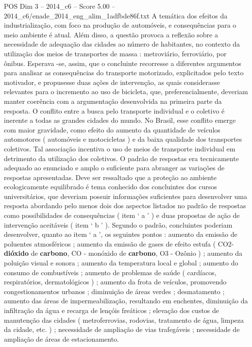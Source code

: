 \begin{textsample}{POS Dim 3 – 2014\_c6 – Score 5.00 – 2014\_c6/enade\_2014\_eng\_alim\_1adfbde86f.txt}
A temática dos efeitos da industrialização, com foco na produção de automóveis, e consequências para o meio ambiente é atual.
Além disso, a questão provoca a reflexão sobre a necessidade de adequação das cidades ao número de habitantes, no contexto da utilização dos meios de transportes de massa : metroviário, ferroviário, por ônibus.
Esperava -se, assim, que o concluinte recorresse a diferentes argumentos para analisar as consequências do transporte motorizado, explicitados pelo texto motivador, e propusesse duas ações de intervenção, as quais considerasse relevantes para o incremento ao uso de bicicleta, que, preferencialmente, deveriam manter coerência com a argumentação desenvolvida na primeira parte da resposta.
O conflito entre a busca pelo transporte individual e o coletivo é inerente a todas as grandes cidades do mundo.
No Brasil, esse conflito emerge com maior gravidade, como efeito do aumento da quantidade de veículos automotores ( automóveis e motocicletas ) e da baixa qualidade dos transportes coletivos.
Tal associação incentiva o uso de meios de transporte individual em detrimento da utilização dos coletivos.
O padrão de respostas era tecnicamente adequado ao enunciado e amplo o suficiente para abranger as variações de respostas apresentadas.
Deve ser ressaltado que a proteção ao ambiente ecologicamente equilibrado é tema conhecido dos concluintes dos cursos universitários, que deveriam possuir informações suficientes para desenvolver uma resposta abordando pelo menos dois dos aspectos listados no padrão de respostas como possibilidades de consequências ( item ‘ a ’ ) e duas propostas de ação de intervenção aceitáveis ( item ‘ b ’ ).
Segundo o padrão, concluintes poderiam desenvolver, quanto ao item ‘ a ’, os seguintes pontos : aumento da emissão de poluentes atmosféricos ; aumento da emissão de gases de efeito estufa ( CO2- \textbf{dióxido} de \textbf{carbono}, CO - monóxido de \textbf{carbono}, O3 - Ozônio ) ; aumento da poluição visual e sonora ; aumento da temperatura local e global ; aumento do consumo de combustíveis ; aumento de problemas de saúde ( cardíacos, respiratórios, dermatológicos ) ; aumento da frota de veículos, promovendo congestionamentos urbanos ; diminuição de áreas verdes ; desmatamento ; aumento das áreas de impermeabilização, resultando em enchentes, diminuição da infiltração da água e recarga de lençóis freáticos ; elevação dos custos de manutenção das cidades ( metroferrovias, rodovias, tratamento de água, limpeza da cidade, etc. ) ; necessidade de ampliação de vias trafegáveis ; necessidade de ampliação de áreas de estacionamento.

\end{textsample}
